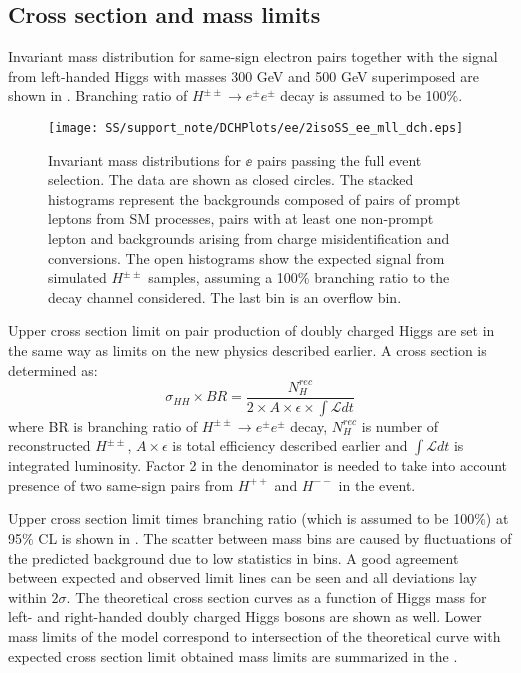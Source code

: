 
\toDo[CLs = CLs+b/CLb. What is the signal in case of limit on new physics?]

\subsection{Cross section and mass limits}

Invariant mass distribution for same-sign electron pairs together with the signal from left-handed Higgs with masses 300 GeV and 500 GeV superimposed are shown in .
Branching ratio of $H^{\pm\pm} \to e^{\pm}e^{\pm}$ decay is assumed to be 100$\%$.

\begin{figure}[h]
\begin{center}
\texttt{[image: SS/support\_note/DCHPlots/ee/2isoSS\_ee\_mll\_dch.eps]}
\caption{\toDo Invariant mass distributions for $\ee$ pairs passing the full event selection. 
The data are shown as closed circles. The stacked histograms represent 
the backgrounds composed of pairs of prompt leptons from SM processes, 
pairs with at least one non-prompt lepton and backgrounds arising from charge misidentification and conversions. 
The open histograms show the expected signal from simulated $H^{\pm\pm}$ samples,
assuming a 100\% branching ratio to the decay channel considered. The last bin is an overflow bin.}
\label{fig:signal_mass}
\end{center}
\end{figure}

Upper cross section limit on pair production of doubly charged Higgs are set in the same way as limits on the new physics described earlier.
A cross section is determined as:
\begin{equation}
 \sigma_{HH}\times BR =\frac{N_{H}^{rec}}{2\times A\times \epsilon \times \int \mathscr{L} dt}
\end{equation}
where BR is branching ratio of $H^{\pm\pm} \to e^{\pm}e^{\pm}$ decay, $N_{H}^{rec}$ is number of reconstructed $H^{\pm\pm}$, $A\times \epsilon$ is total efficiency described earlier and
$\int \mathscr{L} dt$ is integrated luminosity.
Factor 2 in the denominator is needed to take into account presence of two same-sign pairs from $H^{++}$ and $H^{--}$ in the event.

Upper cross section limit times branching ratio (which is assumed to be 100$\%$) at 95$\%$ CL is shown in .
The scatter between mass bins are caused by fluctuations of the predicted background due to low statistics in bins.
A good agreement between expected and observed limit lines can be seen and all deviations lay within $2\sigma$.
The theoretical cross section curves as a function of Higgs mass for left- and right-handed doubly charged Higgs bosons 
are shown as well.
Lower mass limits of the model correspond to intersection of the theoretical curve with expected cross section limit obtained
mass limits are summarized in the .

